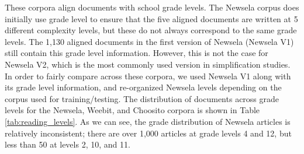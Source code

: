 \documentclass[thesis.tex]{subfiles}
\begin{document}
These corpora align documents with school grade levels. The Newsela corpus does initially use grade level to ensure that the five aligned documents are written at 5 different complexity levels, but these do not always correspond to the same grade levels. %
The 1,130 aligned documents in the first version of Newsela (Newsela V1) still contain this grade level information. However, this is not the case for Newsela V2, which is the most commonly used version in simplification studies. In order to fairly compare across these corpora, we used Newsela V1 along with its grade level information, and re-organized Newsela levels depending on the corpus used for training/testing. The distribution of documents across grade levels for the Newsela, Weebit, and Choosito corpora is shown in Table \ref{tab:reading_levels}. As we can see, the grade distribution of Newsela articles is relatively inconsistent; there are over 1,000 articles at grade levels 4 and 12, but less than 50 at levels 2, 10, and 11.
\end{document}
